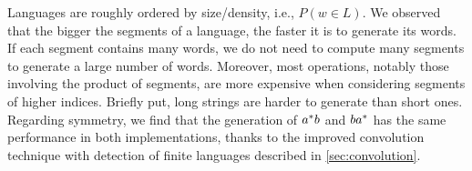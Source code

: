 Languages are roughly ordered by size/density, i.e., $P (w\in L)$. We
observed that the bigger the segments of a language, the faster it is
to generate its words.  If each segment contains many words, we do not
need to compute many segments to generate a large number of words.
Moreover, most operations, notably those involving the product of
segments, are more expensive when considering segments of higher
indices. Briefly put, long strings are harder to generate than short
ones.
%
Regarding symmetry, we find that the generation of $a^*b$ and
$ba^*$ has the same performance in both implementations,
thanks to the improved convolution technique
with detection of finite languages described in \cref{sec:convolution}.



